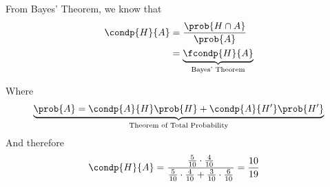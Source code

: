 \documentclass[14pt,fleqn]{extarticle}
\begin{document}
\begin{problem}
\begin{step}
	From Bayes' Theorem, we know that 
	\begin{align}
          \condp{H}{A} &= \dfrac{\prob{H\cap A}}{\prob{A}} \\
          &= \underbrace{\fcondp{H}{A}}_{\text{Bayes' Theorem}}
        \end{align} 
        
        Where 
        \[\underbrace{\prob{A} = \condp{A}{H}\prob{H} + \condp{A}{H'}\prob{H'}}_{\text{Theorem of Total Probability}} \]
        And therefore
        \begin{align}
          \condp{H}{A} &= \dfrac{\frac{5}{10}\cdot\frac{4}{10}}
          {\frac{5}{10}\cdot\frac{4}{10} + \frac{3}{10}\cdot\frac{6}{10} } = \dfrac{10}{19}
        \end{align}    
\end{step}
\end{problem}
\end{document}
